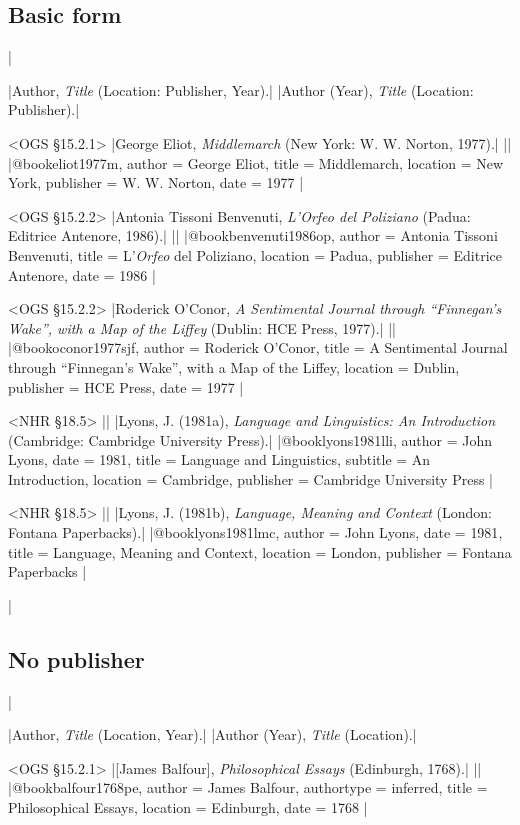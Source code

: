 \documentclass[extrafontsizes,11pt,a4paper,oneside]{memoir}
\begin{document}
\subsection{Basic form}
|

\specs
|Author, \emph{Title} (Location: Publisher, Year).|%
|Author (Year), \emph{Title} (Location: Publisher).|

\bibexample<OGS \S15.2.1>
|George Eliot, \emph{Middlemarch} (New York: W. W. Norton, 1977).|%
||%
|@book{eliot1977m,
  author = {George Eliot},
  title = {Middlemarch},
  location = {New York},
  publisher = {W. W. Norton},
  date = {1977}
}|

\bibexample<OGS \S15.2.2>
|Antonia Tissoni Benvenuti, \emph{L'\emph{Orfeo} del Poliziano} (Padua: Editrice Antenore, 1986).|%
||%
|@book{benvenuti1986op,
  author = {Antonia Tissoni Benvenuti},
  title = {L'\emph{Orfeo} del Poliziano},
  location = {Padua},
  publisher = {Editrice Antenore},
  date = {1986}
}|

\bibexample<OGS \S15.2.2>
|Roderick O'Conor, \emph{A Sentimental Journal through \enquote{Finnegan's Wake}, with a Map of the Liffey} (Dublin: HCE Press, 1977).|%
||%
|@book{oconor1977sjf,
  author = {Roderick O'Conor},
  title = {A Sentimental Journal through \enquote{Finnegan's Wake}, with a Map of the {Liffey}},
  location = {Dublin},
  publisher = {HCE Press},
  date = {1977}
}|

\bibexample<NHR \S18.5>
||%
|Lyons, J. (1981a), \emph{Language and Linguistics: An Introduction} (Cambridge: Cambridge University Press).|%
|@book{lyons1981lli,
  author = {John Lyons},
  date = {1981},
  title = {Language and Linguistics},
  subtitle = {An Introduction},
  location = {Cambridge},
  publisher = {Cambridge University Press}
}|

\bibexample<NHR \S18.5>
||%
|Lyons, J. (1981b), \emph{Language, Meaning and Context} (London: Fontana Paperbacks).|%
|@book{lyons1981lmc,
  author = {John Lyons},
  date = {1981},
  title = {Language, Meaning and Context},
  location = {London},
  publisher = {Fontana Paperbacks}
}|


\todoc|
\subsection{No publisher}
|

\specs
|Author, \emph{Title} (Location, Year).|%
|Author (Year), \emph{Title} (Location).|

\bibexample<OGS \S15.2.1>
|{[James Balfour]}, \emph{Philosophical Essays} (Edinburgh, 1768).|%
||%
|@book{balfour1768pe,
  author = {James Balfour},
  authortype = {inferred},
  title = {Philosophical Essays},
  location = {Edinburgh},
  date = {1768}
}|
\end{document}
